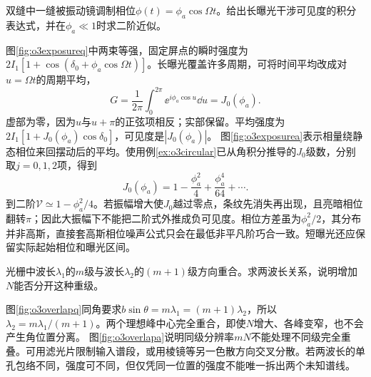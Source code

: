 \begin{exercise}\label{ex:o3exposure}
双缝中一缝被振动镜调制相位$\phi(t)=\phi_a\cos\Omega t$。给出长曝光干涉可见度的积分表达式，并在$\phi_a\ll1$时求二阶近似。
\end{exercise}
\begin{solution}
图\ref{fig:o3exposureq}中两束等强，固定屏点的瞬时强度为$2I_1[1+\cos(\delta_0+\phi_a\cos\Omega t)]$。长曝光覆盖许多周期，可将时间平均改成对$u=\Omega t$的周期平均，
\[
 G=\frac1{2\pi}\int_0^{2\pi}\ee^{i\phi_a\cos u}\dd u=J_0(\phi_a).
\]
虚部为零，因为$u$与$u+\pi$的正弦项相反；实部保留。平均强度为$2I_1[1+J_0(\phi_a)\cos\delta_0]$，可见度是$|J_0(\phi_a)|$。
图\ref{fig:o3exposurea}表示相量绕静态相位来回摆动后的平均。使用例\ref{ex:o3circular}已从角积分推导的$J_0$级数，分别取$j=0,1,2$项，得到
\[
 J_0(\phi_a)=1-\frac{\phi_a^2}{4}+\frac{\phi_a^4}{64}+\cdots.
\]
到二阶$\mathcal V\simeq1-\phi_a^2/4$。若振幅增大使$J_0$越过零点，条纹先消失再出现，且亮暗相位翻转$\pi$；因此大振幅下不能把二阶式外推成负可见度。相位方差虽为$\phi_a^2/2$，其分布并非高斯，直接套高斯相位噪声公式只会在最低非平凡阶巧合一致。短曝光还应保留实际起始相位和曝光区间。
\end{solution}

\begin{exercise}\label{ex:o3gratingorderoverlap}
光栅中波长$\lambda_1$的$m$级与波长$\lambda_2$的$(m+1)$级方向重合。求两波长关系，说明增加$N$能否分开这种重级。
\end{exercise}
\begin{solution}
图\ref{fig:o3overlapq}同角要求$b\sin\theta=m\lambda_1=(m+1)\lambda_2$，所以$\lambda_2=m\lambda_1/(m+1)$。两个理想峰中心完全重合，即使$N$增大、各峰变窄，也不会产生角位置分离。
图\ref{fig:o3overlapa}说明同级分辨率$mN$不能处理不同级完全重叠。可用滤光片限制输入谱段，或用棱镜等另一色散方向交叉分散。若两波长的单孔包络不同，强度可不同，但仅凭同一位置的强度不能唯一拆出两个未知谱线。
\end{solution}

